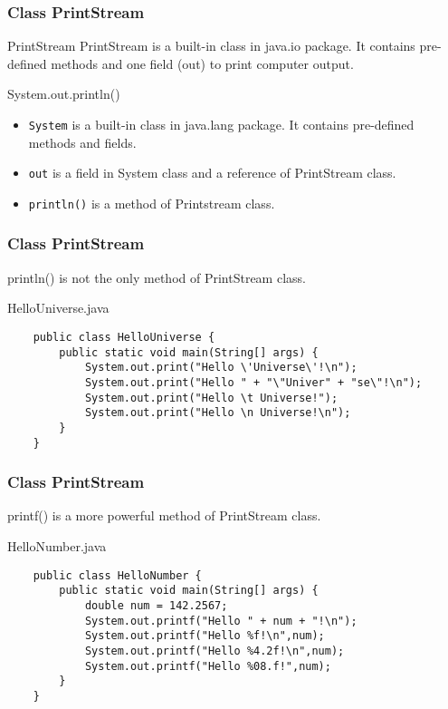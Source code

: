 \documentclass[10pt, compress]{beamer}
\begin{document}
\begin{frame}[fragile]
	\frametitle{Class PrintStream}
	\begin{block}{PrintStream}
		PrintStream is a built-in class in java.io package. It contains pre-defined methods and one field (out) to print computer output.
	\end{block}
	\begin{block}{System.out.println()}
		\begin{itemize}
			\item[] \texttt{System} is a built-in class in java.lang package. It contains pre-defined methods and fields.
			\item[] \texttt{out} is a field in System class and a reference of PrintStream class.
			\item[] \texttt{println()} is a method of Printstream class.
		\end{itemize}
	\end{block}
\end{frame}

\begin{frame}[fragile]
	\frametitle{Class PrintStream}
	println() is not the only method of PrintStream class.
	\begin{block}{HelloUniverse.java}
	\begin{verbatim}
	public class HelloUniverse {
		public static void main(String[] args) {
			System.out.print("Hello \'Universe\'!\n");
			System.out.print("Hello " + "\"Univer" + "se\"!\n");
			System.out.print("Hello \t Universe!");
			System.out.print("Hello \n Universe!\n");
		}
	}
	\end{verbatim}
	\end{block}
\end{frame}

\begin{frame}[fragile]
	\frametitle{Class PrintStream}
	printf() is a more powerful method of PrintStream class.
	\begin{block}{HelloNumber.java}
	\begin{verbatim}
	public class HelloNumber {
		public static void main(String[] args) {
			double num = 142.2567;
			System.out.printf("Hello " + num + "!\n");
			System.out.printf("Hello %f!\n",num);
			System.out.printf("Hello %4.2f!\n",num);
			System.out.printf("Hello %08.f!",num);
		}
	}
	\end{verbatim}
	\end{block}
\end{frame}
\end{document}
